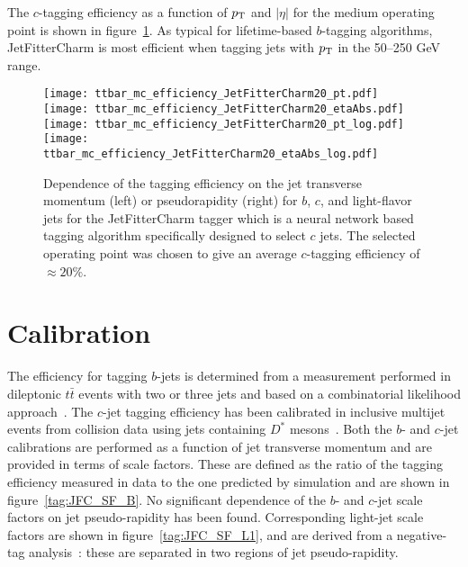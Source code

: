 The $c$-tagging efficiency as a function of $p_{\rm T}$ and $|\eta|$ for the medium operating point is shown in figure~\ref{tag:fig:medium-eff}. As typical for lifetime-based $b$-tagging algorithms, JetFitterCharm is most efficient when tagging jets with $p_{\rm T}$ in the 50--250 GeV range.

\begin{figure}
  \begin{center}
\texttt{[image: ttbar\_mc\_efficiency\_JetFitterCharm20\_pt.pdf]}
\texttt{[image: ttbar\_mc\_efficiency\_JetFitterCharm20\_etaAbs.pdf]}\\
\texttt{[image: ttbar\_mc\_efficiency\_JetFitterCharm20\_pt\_log.pdf]}
\texttt{[image: ttbar\_mc\_efficiency\_JetFitterCharm20\_etaAbs\_log.pdf]}
\caption{Dependence of the tagging efficiency on the jet transverse momentum (left) or pseudorapidity (right) for $b$, $c$, and light-flavor jets for the JetFitterCharm tagger which is a neural network based tagging algorithm specifically designed to select $c$ jets. The selected operating point was chosen to give an average $c$-tagging efficiency of $\approx 20\%$. \jfcplotswherefrom}
  \label{tag:fig:medium-eff}
  \end{center}
\end{figure} 



\clearpage
\section{Calibration}
\label{tag:sec:calib}
The efficiency for tagging $b$-jets is determined from a measurement performed in dileptonic $t\bar{t}$ events with two or three jets and based on a combinatorial likelihood approach~\cite{Giacinto}. The $c$-jet tagging efficiency has been calibrated in inclusive multijet events from collision data using jets  containing $D^*$ mesons~\cite{bc2014}. Both the $b$- and $c$-jet calibrations are performed as a function of jet transverse momentum and are provided in terms of scale factors. These are defined as the ratio of the tagging efficiency measured in data to the one predicted by simulation and are shown in figure~\ref{tag:JFC_SF_B}.  No significant dependence of the $b$- and $c$-jet scale factors on jet pseudo-rapidity has been found. Corresponding light-jet scale factors are shown in figure~\ref{tag:JFC_SF_L1}, and are derived from a negative-tag analysis~\cite{bc2014}: these are separated in two regions of jet pseudo-rapidity.


